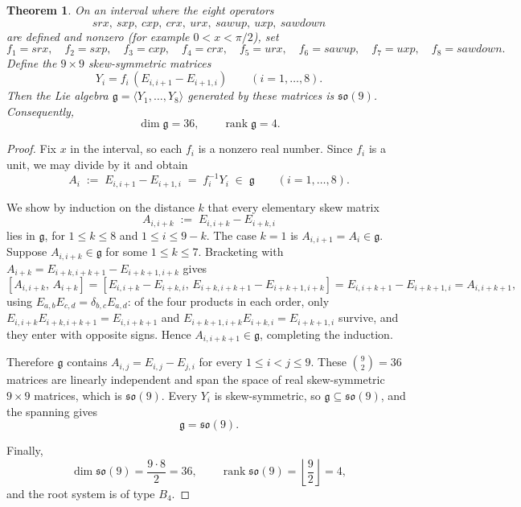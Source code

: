 \documentclass{article}
\newtheorem{theorem}{Theorem}
\begin{document}
\begin{theorem}
On an interval where the eight operators
\[
srx,\ sxp,\ cxp,\ crx,\ urx,\ sawup,\ uxp,\ sawdown
\]
are defined and nonzero (for example \(0<x<\pi/2\)), set
\[
f_1=srx,\quad f_2=sxp,\quad f_3=cxp,\quad f_4=crx,\quad
f_5=urx,\quad f_6=sawup,\quad f_7=uxp,\quad f_8=sawdown.
\]
Define the \(9\times 9\) skew-symmetric matrices
\[
Y_i=f_i\,(E_{i,i+1}-E_{i+1,i})\qquad (i=1,\dots,8).
\]
Then the Lie algebra \(\mathfrak{g}=\langle Y_1,\dots,Y_8\rangle\) generated by
these matrices is \(\mathfrak{so}(9)\). Consequently,
\[
\dim\mathfrak{g}=36,\qquad \operatorname{rank}\mathfrak{g}=4.
\]
\end{theorem}

\begin{proof}
Fix \(x\) in the interval, so each \(f_i\) is a nonzero real number. Since
\(f_i\) is a unit, we may divide by it and obtain
\[
A_i \;:=\; E_{i,i+1}-E_{i+1,i} \;=\; f_i^{-1} Y_i \;\in\; \mathfrak{g}
\qquad (i=1,\dots,8).
\]

We show by induction on the distance \(k\) that every elementary skew matrix
\[
A_{i,i+k} \;:=\; E_{i,i+k}-E_{i+k,i}
\]
lies in \(\mathfrak{g}\), for \(1\le k\le 8\) and \(1\le i\le 9-k\).
The case \(k=1\) is \(A_{i,i+1}=A_i\in\mathfrak{g}\). Suppose
\(A_{i,i+k}\in\mathfrak{g}\) for some \(1\le k\le 7\). Bracketing with
\(A_{i+k}=E_{i+k,i+k+1}-E_{i+k+1,i+k}\) gives
\[
[A_{i,i+k},\,A_{i+k}]
= [E_{i,i+k}-E_{i+k,i},\,E_{i+k,i+k+1}-E_{i+k+1,i+k}]
= E_{i,i+k+1}-E_{i+k+1,i}
= A_{i,i+k+1},
\]
using \(E_{a,b}E_{c,d}=\delta_{b,c}E_{a,d}\): of the four products in each
order, only \(E_{i,i+k}E_{i+k,i+k+1}=E_{i,i+k+1}\) and
\(E_{i+k+1,i+k}E_{i+k,i}=E_{i+k+1,i}\) survive, and they enter with opposite
signs. Hence \(A_{i,i+k+1}\in\mathfrak{g}\), completing the induction.

Therefore \(\mathfrak{g}\) contains \(A_{i,j}=E_{i,j}-E_{j,i}\) for every
\(1\le i<j\le 9\). These \(\binom{9}{2}=36\) matrices are linearly independent
and span the space of real skew-symmetric \(9\times 9\) matrices, which is
\(\mathfrak{so}(9)\). Every \(Y_i\) is skew-symmetric, so
\(\mathfrak{g}\subseteq\mathfrak{so}(9)\), and the spanning gives
\[
\mathfrak{g}=\mathfrak{so}(9).
\]

Finally,
\[
\dim\mathfrak{so}(9)=\frac{9\cdot 8}{2}=36,\qquad
\operatorname{rank}\mathfrak{so}(9)=\left\lfloor\frac{9}{2}\right\rfloor=4,
\]
and the root system is of type \(B_4\).
\end{proof}
\end{document}
